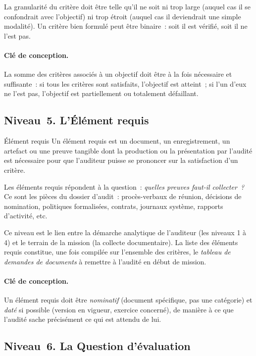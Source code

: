 La granularité du critère doit être telle qu'il ne soit ni trop large (auquel
cas il se confondrait avec l'objectif) ni trop étroit (auquel cas il deviendrait
une simple modalité). Un critère bien formulé peut être binaire~: soit il est
vérifié, soit il ne l'est pas.

\paragraph{Clé de conception.}
La somme des critères associés à un objectif doit être à la fois nécessaire et
suffisante~: si tous les critères sont satisfaits, l'objectif est atteint~; si
l'un d'eux ne l'est pas, l'objectif est partiellement ou totalement défaillant.

\subsection{Niveau~5. L'Élément requis}

\begin{boxdef}{Élément requis}
Un élément requis est un document, un enregistrement, un artefact ou une
preuve tangible dont la production ou la présentation par l'audité est nécessaire
pour que l'auditeur puisse se prononcer sur la satisfaction d'un critère.
\end{boxdef}

Les éléments requis répondent à la question~: \emph{quelles preuves faut-il
collecter~?} Ce sont les pièces du dossier d'audit~: procès-verbaux de réunion,
décisions de nomination, politiques formalisées, contrats, journaux système,
rapports d'activité, etc.

Ce niveau est le lien entre la démarche analytique de l'auditeur (les niveaux 1
à 4) et le terrain de la mission (la collecte documentaire). La liste des
éléments requis constitue, une fois compilée sur l'ensemble des critères, le
\emph{tableau de demandes de documents} à remettre à l'audité en début de
mission.

\paragraph{Clé de conception.}
Un élément requis doit être \emph{nominatif} (document spécifique, pas une
catégorie) et \emph{daté} si possible (version en vigueur, exercice concerné),
de manière à ce que l'audité sache précisément ce qui est attendu de lui.

\subsection{Niveau~6. La Question d'évaluation}

